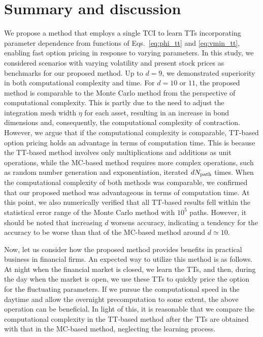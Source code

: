 \section{Summary and discussion}\label{sec:summary}
We propose a method that employs a single TCI to learn TTs incorporating parameter dependence from functions of Eqs.~\eqref{eq:phi_tt} and \eqref{eq:vmin_tt}, enabling fast option pricing in response to varying parameters. 
In this study, we considered scenarios with varying volatility and present stock prices as benchmarks for our proposed method. 
Up to \(d=9\), we demonstrated superiority in both computational complexity and time. For \(d=10\) or \(11\), the proposed method is comparable to the Monte Carlo method from the perspective of computational complexity. This is partly due to the need to adjust the integration mesh width \(\eta\) for each asset, resulting in an increase in bond dimensions and, consequently, the computational complexity of contraction. 
However, we argue that if the computational complexity is comparable, TT-based option pricing holds an advantage in terms of computation time. This is because the TT-based method involves only multiplications and additions as unit operations, while the MC-based method requires more complex operations, such as random number generation and exponentiation, iterated \(d N_{\rm path}\) times. 
When the computational complexity of both methods was comparable, we confirmed that our proposed method was advantageous in terms of computation time. At this point, we also numerically verified that all TT-based results fell within the statistical error range of the Monte Carlo method with \(10^5\) paths. However, it should be noted that increasing \(d\) worsens accuracy, indicating a tendency for the accuracy to be worse than that of the MC-based method around \(d \simeq 10\).

Now, let us consider how the proposed method provides benefits in practical business in financial firms.
An expected way to utilize this method is as follows.
At night when the financial market is closed, we learn the TTs, and then, during the day when the market is open, we use these TTs to quickly price the option for the fluctuating parameters.
If we pursue the computational speed in the daytime and allow the overnight precomputation to some extent, the above operation can be beneficial.
In light of this, it is reasonable that we compare the computational complexity in the TT-based method after the TTs are obtained with that in the MC-based method, neglecting the learning process.

